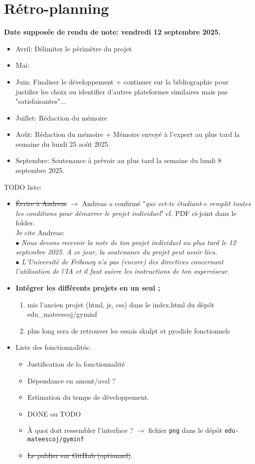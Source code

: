 \documentclass[11pt,a4paper]{article}
\begin{document}
\newpage

\section{Rétro-planning}
\textbf{Date supposée de rendu de note: vendredi 12 septembre 2025.}
\begin{itemize}
    \item Avril: Délimiter le périmètre du projet
    \item Mai:
    \item Juin: Finaliser le développement + continuer sur la bibliographie pour justifier les choix ou identifier d'autres plateformes similaires mais pas "satisfaisantes"...
    \item Juillet: Rédaction du mémoire
    \item Août: Rédaction du mémoire + Mémoire envoyé à l'expert au plus tard la semaine du lundi 25 août 2025.
    \item Septembre: Soutenance à prévoir au plus tard la semaine du lundi 8 septembre 2025.
\end{itemize}

TODO liste:
\begin{itemize}
    \item \sout{Écrire à Andreas} $\longrightarrow$ Andreas a confirmé "\textit{que cet-te étudiant-e remplit toutes les conditions pour démarrer le projet individuel}" cf. PDF ci-joint dans le folder.\\
    Je cite Andreas: \\ 
$\bullet$ \textit{ Nous devons recevoir la note de ton projet individuel au plus tard le 12 septembre 2025. A ce jour, la soutenance du projet peut avoir lieu.\\
$\bullet$ L’Université de Fribourg n’a pas (encore) des directives concernant l’utilisation de l’IA et il faut suivre les instructions de ton superviseur.}\\
    \item \textbf{Intégrer les différents projets en un seul ;}
    \begin{enumerate}
        \item mis l'ancien projet (html, js, css) dans le index.html du dépôt edu\_mateescoj/gyminf
        \item plus long sera de retrouver les essais skulpt et pyodide fonctionnels
    \end{enumerate}
    \item Liste des fonctionnalités:
    \begin{itemize}
        \item Justification de la fonctionnalité
        \item Dépendance en amont/aval ?
        \item Estimation du temps de développement.
        \item DONE ou TODO
    \item À quoi doit ressembler l'interface ? $\rightarrow$ fichier \texttt{png} dans le dépôt \texttt{edu-mateescoj/gyminf}
    \item \sout{Le publier sur GitHub (optionnel)}.
    \end{itemize}
\end{itemize}
\end{document}
